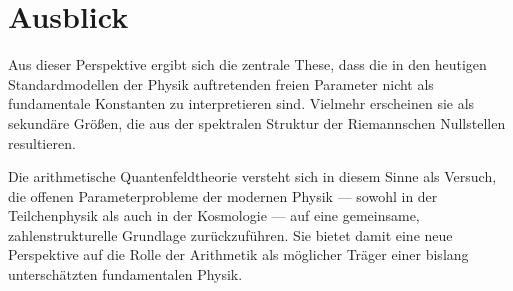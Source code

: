\documentclass[11pt,a4paper]{article}
\begin{document}
	\section{Ausblick}
	
	Aus dieser Perspektive ergibt sich die zentrale These, dass die in den heutigen
	Standardmodellen der Physik auftretenden freien Parameter nicht als
	fundamentale Konstanten zu interpretieren sind. Vielmehr erscheinen sie als
	sekundäre Größen, die aus der spektralen Struktur der Riemannschen
	Nullstellen resultieren.
	
	Die arithmetische Quantenfeldtheorie versteht sich in diesem Sinne als Versuch,
	die offenen Parameterprobleme der modernen Physik --- sowohl in der
	Teilchenphysik als auch in der Kosmologie --- auf eine gemeinsame,
	zahlenstrukturelle Grundlage zurückzuführen. Sie bietet damit eine neue
	Perspektive auf die Rolle der Arithmetik als möglicher Träger einer bislang
	unterschätzten fundamentalen Physik.
	
\end{document}
